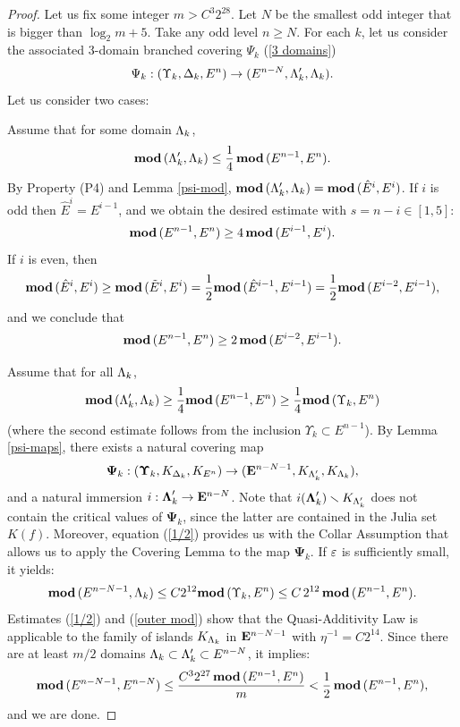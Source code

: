 \begin{proof}
Let us fix some integer $m >  C^3 2^{28}$.
Let $N$ be the smallest odd integer that is bigger than $\log_2 m + 5$.
Take any odd level $n\geq N$. For each $k$,
let us consider the associated 3-domain branched covering $\Psi_k$ (\ref{3 domains})
$$
   \Psi_k: (\Upsilon_k, {\Delta}_k, E^n) \rightarrow (E^{n-N}, {\Lambda}_k', {\Lambda}_k).
$$
Let us consider two cases:

 Assume that for some domain ${\Lambda}_k$,
$$
  { \mathbf{mod}\, } ({\Lambda}_k', {\Lambda}_k)\leq  \frac{1}{4}\, { \mathbf{mod}\, } (E^{n-1},  E^n).
$$
         By Property (P4) and Lemma \ref{psi-mod},
${ \mathbf{mod}\, }({\Lambda}_k' ,  {\Lambda}_k) = { \mathbf{mod}\, } (\hat E^i, E^i)$.
If $i$ is odd then $\hat E^i= E^{i-1}$,
 and   we obtain the desired estimate with $s=n-i\in [1, 5]$:
$$
  { \mathbf{mod}\, } (E^{n-1}, E^n) \geq 4\, { \mathbf{mod}\, } ( E^{i-1}, E^i).
$$
If $i$ is even, then
$$
     { \mathbf{mod}\, } (\hat E^i, E^i) \geq { \mathbf{mod}\, }(\tilde E^i, E^i) = \frac{1}{2} { \mathbf{mod}\, } ( \hat E^{i-1}, E^{i-1})=
                              \frac{1}{2} { \mathbf{mod}\, } ( E^{i-2}, E^{i-1}),
$$
and we conclude that
$$
     { \mathbf{mod}\, } (E^{n-1}, E^n) \geq 2\, { \mathbf{mod}\, } ( E^{i-2}, E^{i-1}).
$$


 Assume that for all ${\Lambda}_k$,
\begin{equation}\label{1/2}
  { \mathbf{mod}\, } ({\Lambda}_k', {\Lambda}_k) \geq \frac{1}{4} { \mathbf{mod}\, } (E^{n-1},  E^n)\geq \frac{1}{4} { \mathbf{mod}\, }(\Upsilon_k, E^n)
\end{equation}
(where the second estimate follows from the inclusion $\Upsilon_k\subset E^{n-1}$).
By Lemma \ref{psi-maps}, there exists a natural covering map
$$
   \boldsymbol{\Psi}_k: (\boldsymbol{\Upsilon}_k, K_{{\Delta}_k}, K_{E^n} )\rightarrow ({\mathbf{E}}^{n-N-1}, K_{{\Lambda}_k'}, K_{{\Lambda}_k}),
$$
and  a natural immersion $ i: \boldsymbol{{\Lambda}}_k'  \rightarrow {\mathbf{E}}^{n-N} $.
Note that $i(\boldsymbol{{\Lambda}}_k')\smallsetminus K_{{\Lambda}_k'}$ does not contain the critical values of $\boldsymbol{\Psi}_k$,
since the latter are contained in the Julia set $K(f)$.
Moreover, equation (\ref{1/2}) provides us with the Collar Assumption
that allows us to apply the Covering Lemma to the map $\boldsymbol{\Psi}_k$.
If ${\varepsilon}$ is sufficiently small, it yields:
\begin{equation}\label{outer mod}
  { \mathbf{mod}\, } (E^{n-N-1},  {\Lambda}_k) \leq C 2^{12} { \mathbf{mod}\, }(\Upsilon_k,  E^n) \leq C\, 2^{12}\, { \mathbf{mod}\, }(E^{n-1}, E^n).
\end{equation}
Estimates (\ref{1/2}) and (\ref{outer mod}) show that the Quasi-Additivity Law is applicable
to the family of islands $K_{{\Lambda}_k}$ in ${\mathbf{E}}^{n-N-1}$
with $\eta^{-1}= C 2^{14}$.
 Since there are at least $m/2$ domains ${\Lambda}_k\subset {\Lambda}_k'\subset E^{n-N}$,
it implies:
$$
      { \mathbf{mod}\, }(E^{n-N-1}, E^{n-N}) \leq \frac{C^3 2^{27} \, { \mathbf{mod}\, }(E^{n-1}, E^n )}  {m}  < \frac{1}{2}\, { \mathbf{mod}\, }(E^{n-1}, E^n),
$$
and we are done.
\end{proof}


